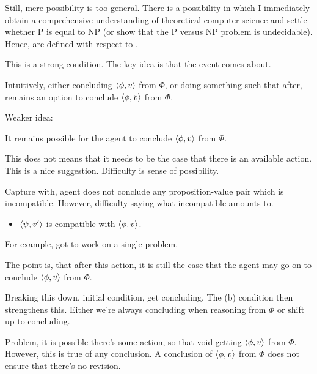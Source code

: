 \begin{note}
  Still, mere possibility is too general.
  There is a possibility in which I immediately obtain a comprehensive understanding of theoretical computer science and settle whether P is equal to NP (or show that the P versus NP problem is undecidable).
  Hence,  are defined with respect to .
\end{note}



\begin{note}

  This is a strong condition.
  The key idea is that the event comes about.

  Intuitively, either concluding \(\langle \phi, v \rangle\) from \(\Phi\), or doing something such that after, remains an option to conclude \(\langle \phi, v \rangle\) from \(\Phi\).

  Weaker idea:

  It remains possible for the agent to conclude \(\langle \phi, v \rangle\) from \(\Phi\).

  This does not means that it needs to be the case that there is an available action.
  This is a nice suggestion.
  Difficulty is sense of possibility.

  Capture with, agent does not conclude any proposition-value pair which is incompatible.
  However, difficulty saying what incompatible amounts to.

  \begin{itemize}
    \item
      \(\langle \psi, v' \rangle\) is compatible with \(\langle \phi, v \rangle\).
  \end{itemize}

  For example, got to work on a single problem.

  The point is, that after this action, it is still the case that the agent may go on to conclude \(\langle \phi, v \rangle\) from \(\Phi\).

  Breaking this down, initial condition, get concluding.
  The (b) condition then strengthens this.
  Either we're always concluding when reasoning from \(\Phi\) or shift up to concluding.

  Problem, it is possible there's some action, so that void getting \(\langle \phi, v \rangle\) from \(\Phi\).
  However, this is true of any conclusion.
  A conclusion of \(\langle \phi, v \rangle\) from \(\Phi\) does not ensure that there's no revision.
\end{note}

